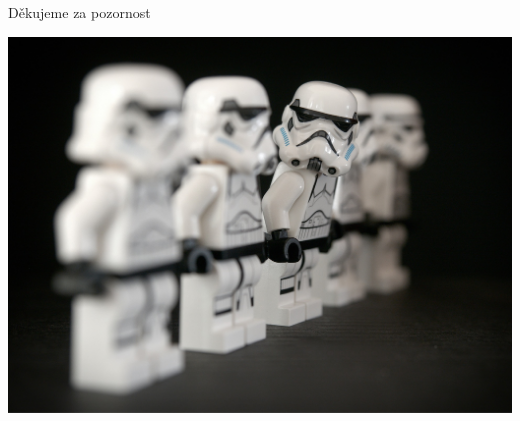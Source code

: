 \documentclass[xcolor=table]{beamer}
\begin{document}
\begin{frame}
\begin{center}
\begin{huge}
Děkujeme za pozornost
\end{huge}
  \centering
  \includegraphics[width=.8\linewidth]{stormtroop.jpg}
\end{center}

\end{frame}
\end{document}
